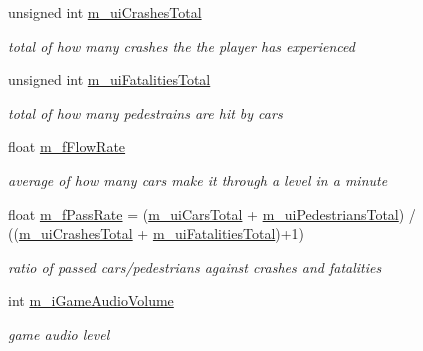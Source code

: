 \begin{DoxyCompactItemize}
\hypertarget{class_profile_aca84c340c094843682075f6d8798b1a7}{}\label{class_profile_aca84c340c094843682075f6d8798b1a7} 
unsigned int \hyperlink{class_profile_aca84c340c094843682075f6d8798b1a7}{m\+\_\+ui\+Crashes\+Total}
\begin{DoxyCompactList}\small\item\em total of how many crashes the the player has experienced \end{DoxyCompactList}\item 
\hypertarget{class_profile_af340a69fb34e4bc00394d4d644d286f5}{}\label{class_profile_af340a69fb34e4bc00394d4d644d286f5} 
unsigned int \hyperlink{class_profile_af340a69fb34e4bc00394d4d644d286f5}{m\+\_\+ui\+Fatalities\+Total}
\begin{DoxyCompactList}\small\item\em total of how many pedestrains are hit by cars \end{DoxyCompactList}\item 
\hypertarget{class_profile_aa542d28bec2f4eed0e79f01428e7b88c}{}\label{class_profile_aa542d28bec2f4eed0e79f01428e7b88c} 
float \hyperlink{class_profile_aa542d28bec2f4eed0e79f01428e7b88c}{m\+\_\+f\+Flow\+Rate}
\begin{DoxyCompactList}\small\item\em average of how many cars make it through a level in a minute \end{DoxyCompactList}\item 
\hypertarget{class_profile_ad6d078cfa75a1e6ac7351f724a48116b}{}\label{class_profile_ad6d078cfa75a1e6ac7351f724a48116b} 
float \hyperlink{class_profile_ad6d078cfa75a1e6ac7351f724a48116b}{m\+\_\+f\+Pass\+Rate} = (\hyperlink{class_profile_a735b68ae846ce7fe33adc71ddf7ae301}{m\+\_\+ui\+Cars\+Total} + \hyperlink{class_profile_abe8f54c015b06ad58f59d59fcca02bad}{m\+\_\+ui\+Pedestrians\+Total}) / ((\hyperlink{class_profile_aca84c340c094843682075f6d8798b1a7}{m\+\_\+ui\+Crashes\+Total} + \hyperlink{class_profile_af340a69fb34e4bc00394d4d644d286f5}{m\+\_\+ui\+Fatalities\+Total})+1)
\begin{DoxyCompactList}\small\item\em ratio of passed cars/pedestrians against crashes and fatalities \end{DoxyCompactList}\item 
\hypertarget{class_profile_abe25a6803a857da40de321b06be657d5}{}\label{class_profile_abe25a6803a857da40de321b06be657d5} 
int \hyperlink{class_profile_abe25a6803a857da40de321b06be657d5}{m\+\_\+i\+Game\+Audio\+Volume}
\begin{DoxyCompactList}\small\item\em game audio level \end{DoxyCompactList}\item 

\end{DoxyCompactItemize}
